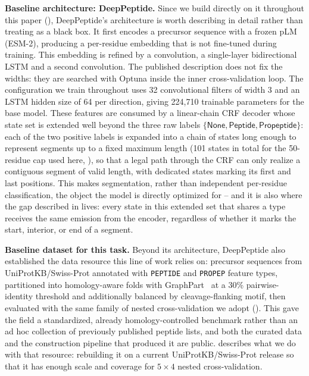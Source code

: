 \documentclass{article}
\begin{document}
\textbf{Baseline architecture: DeepPeptide.} Since we build directly on it throughout this paper (), DeepPeptide's architecture is worth describing in detail rather than treating as a black box. It first encodes a precursor sequence with a frozen pLM (ESM-2), producing a per-residue embedding that is not fine-tuned during training. This embedding is refined by a convolution, a single-layer bidirectional LSTM and a second convolution. The published description does not fix the widths: they are searched with Optuna inside the inner cross-validation loop. The configuration we train throughout uses 32 convolutional filters of width 3 and an LSTM hidden size of 64 per direction, giving 224{,}710 trainable parameters for the base model. These features are consumed by a linear-chain CRF decoder whose state set is extended well beyond the three raw labels $\{\textsf{None}, \textsf{Peptide}, \textsf{Propeptide}\}$: each of the two positive labels is expanded into a chain of states long enough to represent segments up to a fixed maximum length (101 states in total for the 50-residue cap used here, ), so that a legal path through the CRF can only realize a contiguous segment of valid length, with dedicated states marking its first and last positions. This makes segmentation, rather than independent per-residue classification, the object the model is directly optimized for -- and it is also where the gap described in  lives: every state in this extended set that shares a type receives the same emission from the encoder, regardless of whether it marks the start, interior, or end of a segment.

\textbf{Baseline dataset for this task.} Beyond its architecture, DeepPeptide also established the data resource this line of work relies on: precursor sequences from UniProtKB/Swiss-Prot annotated with \texttt{PEPTIDE} and \texttt{PROPEP} feature types, partitioned into homology-aware folds with GraphPart~\citep{graphpart2023} at a 30\% pairwise-identity threshold and additionally balanced by cleavage-flanking motif, then evaluated with the same family of nested cross-validation we adopt (). This gave the field a standardized, already homology-controlled benchmark rather than an ad hoc collection of previously published peptide lists, and both the curated data and the construction pipeline that produced it are public.  describes what we do with that resource: rebuilding it on a current UniProtKB/Swiss-Prot release so that it has enough scale and coverage for $5\times4$ nested cross-validation.
\end{document}
